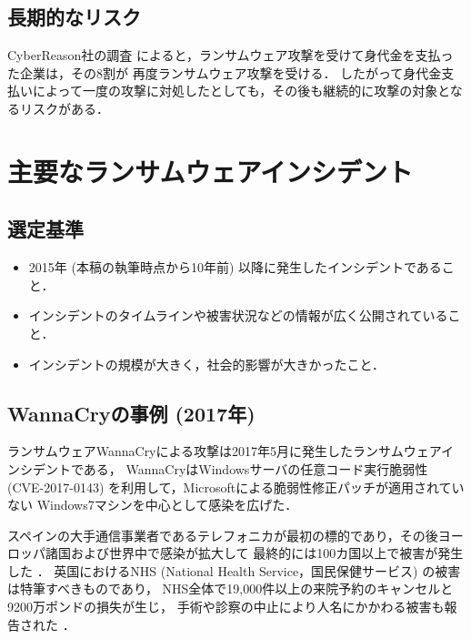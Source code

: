 \subsection{長期的なリスク}
CyberReason社の調査 \cite{cyberreason-report}によると，ランサムウェア攻撃を受けて身代金を支払った企業は，その8割が
再度ランサムウェア攻撃を受ける．
したがって身代金支払いによって一度の攻撃に対処したとしても，その後も継続的に攻撃の対象となるリスクがある．

\section{主要なランサムウェアインシデント}
\subsection{選定基準}
\begin{itemize}
  \item 2015年 (本稿の執筆時点から10年前) 以降に発生したインシデントであること．
  \item インシデントのタイムラインや被害状況などの情報が広く公開されていること．
  \item インシデントの規模が大きく，社会的影響が大きかったこと．
\end{itemize}

\subsection{WannaCryの事例 (2017年)}
ランサムウェアWannaCryによる攻撃は2017年5月に発生したランサムウェアインシデントである，
WannaCryはWindowsサーバの任意コード実行脆弱性 (CVE-2017-0143) を利用して，Microsoftによる脆弱性修正パッチが適用されていない
Windows7マシンを中心として感染を広げた．

スペインの大手通信事業者であるテレフォニカが最初の標的であり，その後ヨーロッパ諸国および世界中で感染が拡大して
最終的には100カ国以上で被害が発生した \cite{wannacry-attack}．
英国におけるNHS (National Health Service，国民保健サービス) の被害は特筆すべきものであり，
NHS全体で19,000件以上の来院予約のキャンセルと9200万ポンドの損失が生じ，
手術や診察の中止により人名にかかわる被害も報告された \cite{kaspersky-wannacry}．

